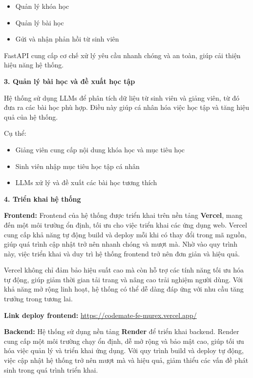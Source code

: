 \begin{itemize}
    \item Quản lý khóa học
    \item Quản lý bài học
    \item Gửi và nhận phản hồi từ sinh viên
\end{itemize}

FastAPI cung cấp cơ chế xử lý yêu cầu nhanh chóng và an toàn, giúp cải thiện hiệu năng hệ thống.

\textbf{3. Quản lý bài học và đề xuất học tập} 

Hệ thống sử dụng LLMs để phân tích dữ liệu từ sinh viên và giảng viên, từ đó đưa ra các bài học phù hợp. Điều này giúp cá nhân hóa việc học tập và tăng hiệu quả của hệ thống.

Cụ thể:

\begin{itemize}
    \item Giảng viên cung cấp nội dung khóa học và mục tiêu học
    \item Sinh viên nhập mục tiêu học tập cá nhân
    \item LLMs xử lý và đề xuất các bài học tương thích
\end{itemize}

\textbf{4. Triển khai hệ thống}

\textbf{Frontend:}
Frontend của hệ thống được triển khai trên nền tảng \textbf{Vercel}, mang đến một môi trường ổn định, tối ưu cho việc triển khai các ứng dụng web. Vercel cung cấp khả năng tự động build và deploy mỗi khi có thay đổi trong mã nguồn, giúp quá trình cập nhật trở nên nhanh chóng và mượt mà. Nhờ vào quy trình này, việc triển khai và duy trì hệ thống frontend trở nên đơn giản và hiệu quả.

Vercel không chỉ đảm bảo hiệu suất cao mà còn hỗ trợ các tính năng tối ưu hóa tự động, giúp giảm thời gian tải trang và nâng cao trải nghiệm người dùng. Với khả năng mở rộng linh hoạt, hệ thống có thể dễ dàng đáp ứng với nhu cầu tăng trưởng trong tương lai.

\par \textbf{Link deploy frontend:} \textcolor{blue}{\href{https://codemate-fe-murex.vercel.app/}{https://codemate-fe-murex.vercel.app/}}

\textbf{Backend:}
Hệ thống sử dụng nền tảng \textbf{Render} để triển khai backend. Render cung cấp một môi trường chạy ổn định, dễ mở rộng và bảo mật cao, giúp tối ưu hóa việc quản lý và triển khai ứng dụng. Với quy trình build và deploy tự động, việc cập nhật hệ thống trở nên mượt mà và hiệu quả, giảm thiểu các vấn đề phát sinh trong quá trình triển khai.

